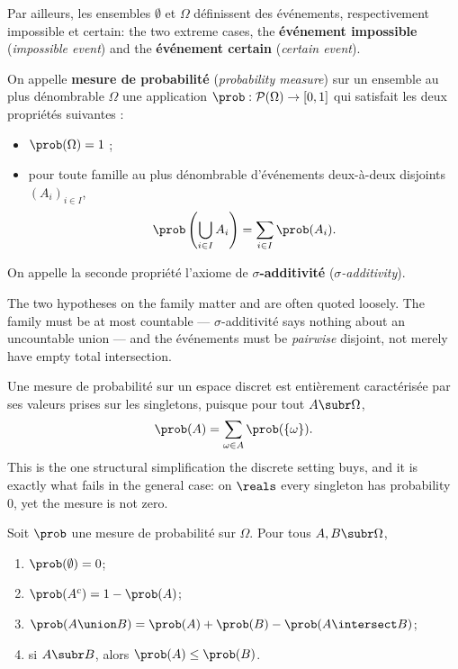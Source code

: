 Par ailleurs, les ensembles $\emptyset$ et $\Omega$ définissent des événements,
respectivement impossible et certain: the two extreme cases, the
\textbf{événement impossible} (\textit{impossible event}) and the
\textbf{événement certain} (\textit{certain event}).

\begin{definition}
  On appelle \textbf{mesure de probabilité} (\textit{probability measure}) sur un
  ensemble au plus dénombrable $\Omega$ une application
  $\prob : \mathcal{P}(\Omega) \to [0,1]$ qui satisfait les deux propriétés
  suivantes :
  \begin{itemize}
    \item $\prob(\Omega) = 1$ ;
    \item pour toute famille au plus dénombrable d'événements deux-à-deux
      disjoints $(A_{i})_{i \in I}$,
      \[ \prob\left( \bigcup_{i \in I} A_{i} \right)
           = \sum_{i \in I} \prob(A_{i}). \]
  \end{itemize}
  On appelle la seconde propriété l'axiome de
  \textbf{$\sigma$-additivité} (\textit{$\sigma$-additivity}).
\end{definition}

The two hypotheses on the family matter and are often quoted loosely. The family
must be at most countable --- $\sigma$-additivité says nothing about an
uncountable union --- and the événements must be \emph{pairwise} disjoint, not
merely have empty total intersection.

\begin{remark}
  Une mesure de probabilité sur un espace discret est entièrement caractérisée
  par ses valeurs prises sur les singletons, puisque pour tout $A \subr \Omega$,
  \[ \prob(A) = \sum_{\omega \in A} \prob(\{\omega\}). \]
  This is the one structural simplification the discrete setting buys, and it is
  exactly what fails in the general case: on $\reals$ every singleton has
  probability $0$, yet the mesure is not zero.
\end{remark}

\begin{prop}
  Soit $\prob$ une mesure de probabilité sur $\Omega$. Pour tous
  $A, B \subr \Omega$,
  \begin{enumerate}
    \item $\prob(\emptyset) = 0$;
    \item $\prob(A^{c}) = 1 - \prob(A)$;
    \item $\prob(A \union B) = \prob(A) + \prob(B) - \prob(A \intersect B)$;
    \item si $A \subr B$, alors $\prob(A) \le \prob(B)$.
  \end{enumerate}
\end{prop}

